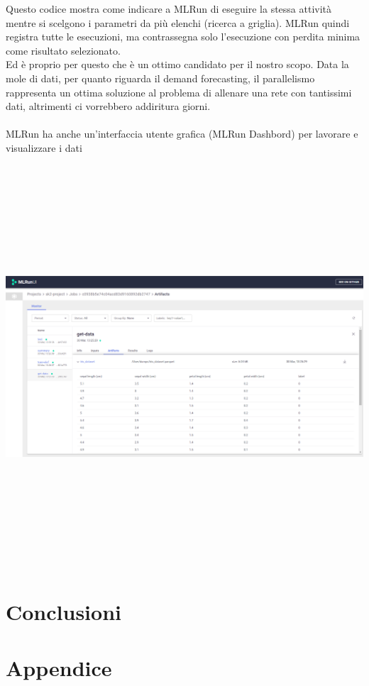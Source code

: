 \documentclass[12pt,a4paper]{report}
\begin{document}
Questo codice mostra come indicare a MLRun di eseguire la stessa attività mentre si scelgono i parametri da più elenchi (ricerca a griglia). MLRun quindi registra tutte le esecuzioni, ma contrassegna solo l'esecuzione con perdita minima come risultato selezionato.\\
Ed è proprio per questo che è un ottimo candidato per il nostro scopo. Data la mole di dati, per quanto riguarda il demand forecasting, il parallelismo rappresenta un ottima soluzione al problema di allenare una rete con tantissimi dati, altrimenti ci vorrebbero addiritura giorni.\\
\\
MLRun ha anche un'interfaccia utente grafica (MLRun Dashbord) per lavorare e visualizzare i dati
\begin{center}
    \includegraphics[width=15cm,height=15cm,keepaspectratio]{MLRun Dashbord}
\end{center}

\chapter{Conclusioni}

\chapter*{Appendice}
\end{document}
